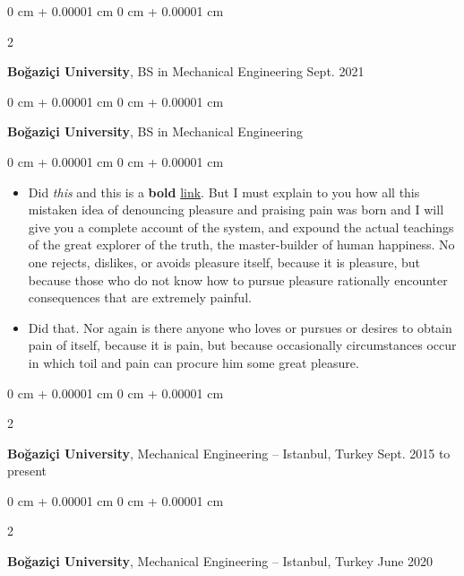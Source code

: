 \documentclass[10pt, letterpaper]{article}
\newenvironment{highlights}{
    \begin{itemize}[
        topsep=0.10 cm,
        parsep=0.10 cm,
        partopsep=0pt,
        itemsep=0pt,
        leftmargin=0 cm + 10pt
    ]
}{
    \end{itemize}
} %
\newenvironment{onecolentry}{
    \begin{adjustwidth}{
        0 cm + 0.00001 cm
    }{
        0 cm + 0.00001 cm
    }
}{
    \end{adjustwidth}
} %
\newenvironment{twocolentry}[2][]{
    \onecolentry
    \def\secondColumn{#2}
    \setcolumnwidth{\fill, 4.5 cm}
    \begin{paracol}{2}
}{
    \switchcolumn \raggedleft \secondColumn
    \end{paracol}
    \endonecolentry
} %
\begin{document}
        \vspace{0.2 cm}

        \begin{twocolentry}{
            Sept. 2021
        }
            \textbf{Boğaziçi University}, BS in Mechanical Engineering\end{twocolentry}



        \vspace{0.2 cm}

        \begin{onecolentry}
            \textbf{Boğaziçi University}, BS in Mechanical Engineering\end{onecolentry}

        \vspace{0.10 cm}
        \begin{onecolentry}
            \begin{highlights}
                \item Did \textit{this} and this is a \textbf{bold} \href{https://example.com}{link}. But I must explain to you how all this mistaken idea of denouncing pleasure and praising pain was born and I will give you a complete account of the system, and expound the actual teachings of the great explorer of the truth, the master-builder of human happiness. No one rejects, dislikes, or avoids pleasure itself, because it is pleasure, but because those who do not know how to pursue pleasure rationally encounter consequences that are extremely painful.
                \item Did that. Nor again is there anyone who loves or pursues or desires to obtain pain of itself, because it is pain, but because occasionally circumstances occur in which toil and pain can procure him some great pleasure.
            \end{highlights}
        \end{onecolentry}


        \vspace{0.2 cm}

        \begin{twocolentry}{
            Sept. 2015 to present
        }
            \textbf{Boğaziçi University}, Mechanical Engineering -- Istanbul, Turkey\end{twocolentry}



        \vspace{0.2 cm}

        \begin{twocolentry}{
            June 2020
        }
            \textbf{Boğaziçi University}, Mechanical Engineering -- Istanbul, Turkey\end{twocolentry}
\end{document}

